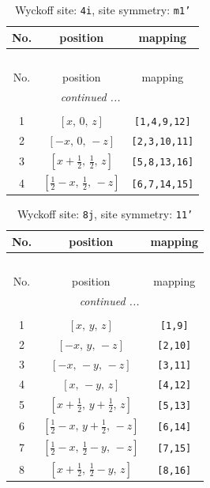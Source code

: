 \documentclass[fleqn,8pt]{jsarticle}
\begin{document}
\renewcommand{\arraystretch}{1.2}
\begin{longtable}{ccc}
\caption{Wyckoff site: {\tt 4i}, site symmetry: {\tt m1'}}
 \\
 \hline \hline
No. & position & mapping \\ \hline \endfirsthead

\multicolumn{2}{l}{\tablename\ \thetable{}} \\
 \hline \hline
No. & position & mapping \\ \hline \endhead

 \hline \hline
\multicolumn{2}{r}{\footnotesize\it continued ...} \\ \endfoot

 \hline \hline
\multicolumn{2}{r}{} \\ \endlastfoot

1 & $\left[ x,\, 0,\, z \right]$ & {\tt [1,4,9,12]} \\ \hline
2 & $\left[ - x,\, 0,\, - z \right]$ & {\tt [2,3,10,11]} \\ \hline
3 & $\left[ x + \frac{1}{2},\, \frac{1}{2},\, z \right]$ & {\tt [5,8,13,16]} \\ \hline
4 & $\left[ \frac{1}{2} - x,\, \frac{1}{2},\, - z \right]$ & {\tt [6,7,14,15]} \\
\end{longtable}
\renewcommand{\arraystretch}{1.2}
\begin{longtable}{ccc}
\caption{Wyckoff site: {\tt 8j}, site symmetry: {\tt 11'}}
 \\
 \hline \hline
No. & position & mapping \\ \hline \endfirsthead

\multicolumn{2}{l}{\tablename\ \thetable{}} \\
 \hline \hline
No. & position & mapping \\ \hline \endhead

 \hline \hline
\multicolumn{2}{r}{\footnotesize\it continued ...} \\ \endfoot

 \hline \hline
\multicolumn{2}{r}{} \\ \endlastfoot

1 & $\left[ x,\, y,\, z \right]$ & {\tt [1,9]} \\ \hline
2 & $\left[ - x,\, y,\, - z \right]$ & {\tt [2,10]} \\ \hline
3 & $\left[ - x,\, - y,\, - z \right]$ & {\tt [3,11]} \\ \hline
4 & $\left[ x,\, - y,\, z \right]$ & {\tt [4,12]} \\ \hline
5 & $\left[ x + \frac{1}{2},\, y + \frac{1}{2},\, z \right]$ & {\tt [5,13]} \\ \hline
6 & $\left[ \frac{1}{2} - x,\, y + \frac{1}{2},\, - z \right]$ & {\tt [6,14]} \\ \hline
7 & $\left[ \frac{1}{2} - x,\, \frac{1}{2} - y,\, - z \right]$ & {\tt [7,15]} \\ \hline
8 & $\left[ x + \frac{1}{2},\, \frac{1}{2} - y,\, z \right]$ & {\tt [8,16]} \\
\end{longtable}
\end{document}
